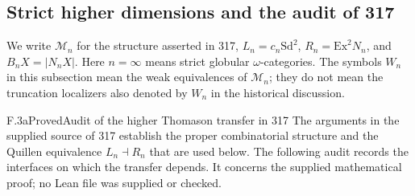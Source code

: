 \subsection{Strict higher dimensions and the audit of 317}
\label{sec:F3}
\providecommand{\sSet}{\mathrm{sSet}}
\providecommand{\nCat}{n\mathrm{Cat}}
\providecommand{\Sd}{\mathrm{Sd}}
\providecommand{\Ex}{\mathrm{Ex}}
We write $\mathcal M_n$ for the structure asserted in 317,
$L_n=c_n\Sd^2$, $R_n=\Ex^2N_n$, and $B_nX=|N_nX|$.
Here $n=\infty$ means strict globular $\omega$-categories. The symbols
$W_n$ in this subsection mean the weak equivalences of $\mathcal M_n$;
they do not mean the truncation localizers also denoted by $W_n$ in
the historical discussion.

\begin{claim}{F.3a}{Proved}{Audit of the higher Thomason transfer in 317}
The arguments in the supplied source of 317 establish the proper
combinatorial structure and the Quillen equivalence
$L_n\dashv R_n$ that are used below. The following audit records the
interfaces on which the transfer depends. It concerns the supplied
mathematical proof; no Lean file was supplied or checked.
\end{claim}
